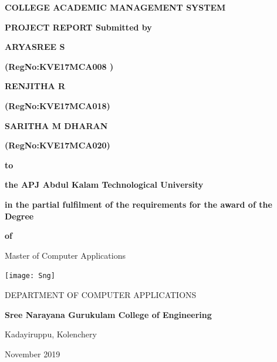 \documentclass[a4paper, 12pt]{report}
\begin{document}
\begin{titlepage}
           \centering
{\bfseries\fontsize{16pt}{16pt}\selectfont COLLEGE ACADEMIC MANAGEMENT SYSTEM\par}
\vspace{.5cm}
	{\fontsize{12pt}{12pt}\selectfont\bfseries PROJECT REPORT Submitted by \par}
	\vspace{.5cm}
 		
	\begin{center}
	{\fontsize{14pt}{14pt}\selectfont\bfseries ARYASREE S \par}
	\vspace{.2cm}
	{\fontsize{12pt}{12pt}\selectfont\bfseries (RegNo:KVE17MCA008 )\par}
        {\fontsize{14pt}{14pt}\selectfont\bfseries  RENJITHA R \par}
\vspace{.2cm}
{\fontsize{12pt}{12pt}\selectfont\bfseries (RegNo:KVE17MCA018)\par}
\vspace{.2cm} 
{\fontsize{14pt}{14pt}\selectfont\bfseries SARITHA M DHARAN\par}
\vspace{.2cm}
{\fontsize{12pt}{12pt}\selectfont\bfseries (RegNo:KVE17MCA020)\par}
	\vspace{.5cm}
\end{center}
	
{\fontsize{12pt}{12pt}\selectfont\bfseries to \par}
	{\fontsize{12pt}{12pt}\selectfont\bfseries the APJ Abdul Kalam Technological University\par}
{\fontsize{12pt}{12pt}\selectfont\bfseries in the partial fulfilment of the requirements for the award of the Degree \par}
{\fontsize{12pt}{12pt}\selectfont\bfseries of  \par}
{\fontsize{12pt}{12pt}\selectfont\begin{textit} Master of Computer Applications\end{textit} \par}
\texttt{[image: Sng]}\par\vspace{0.2cm}
{\fontsize{14pt}{14pt}\selectfont DEPARTMENT OF COMPUTER APPLICATIONS \par}
    \vspace{0.2cm}
	{\fontsize {14pt}{14pt}\selectfont\bfseries Sree Narayana Gurukulam College of Engineering \par}
	\vspace{0.2cm}
	{\fontsize{14pt}{14pt}\selectfont Kadayiruppu, Kolenchery \par}
{\fontsize{14pt}{14pt}\selectfont November 2019 \par}
	
\end{titlepage}
\end{document}
